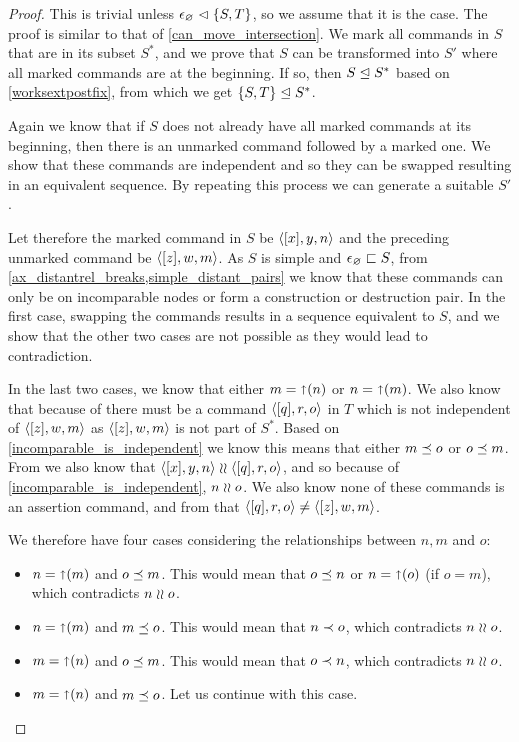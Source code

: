 \begin{proof}
This is trivial unless ${\epsilon_\varnothing}\vartriangleleft{\{{S,T}\}}$, so we assume that it is the case.
The proof is similar to that of \cref{can_move_intersection}.
We mark all commands in $S$ that are in its subset $S^*$, and
we prove that $S$ can be transformed into $S'$
where all marked commands are at the beginning.
If so, then 
${S}\trianglelefteq{S^*}$ based on \cref{worksextpostfix},
from which we get ${\{{S,T}\}}\trianglelefteq{S^*}$.

Again we know that if $S$ does not already have all marked commands at its beginning,
then there is an unmarked command followed by a marked one.
We show that these commands are independent and so they can be swapped
resulting in an equivalent sequence.
By repeating this process we can generate a suitable $S'$.

Let therefore the marked command in $S$ be $\langle{[x],y,n}\rangle$
and the preceding unmarked command be $\langle{[z],w,m}\rangle$.
As $S$ is simple and $\epsilon_\varnothing\sqsubset{S}$, from 
\cref{ax_distantrel_breaks,simple_distant_pairs}
we know that these commands can only be on incomparable nodes or form a construction or destruction pair.
In the first case, swapping the commands results in a sequence equivalent to $S$,
and we show that the other two cases are not possible as they would lead to contradiction.

In the last two cases, we know that either $m=\mathord{\shortuparrow}(n)$ or $n=\mathord{\shortuparrow}(m)$.
We also know that because of {\condApr} there must be 
a command $\langle{[q],r,o}\rangle$ in $T$ which is not independent of $\langle{[z],w,m}\rangle$
as $\langle{[z],w,m}\rangle$ is not part of $S^*$.
Based on \cref{incomparable_is_independent} we know this means that
either $m\preceq o$ or $o\preceq m$.
From {\condApr} we also know that $\langle{[x],y,n}\rangle\mathrel{\wr\wr} \langle{[q],r,o}\rangle$,
and so because of \cref{incomparable_is_independent},
$n\mathrel{\wr\wr} o$.
We also know none of these commands is an assertion command, and 
from {\condDisj} that $\langle{[q],r,o}\rangle\neq\langle{[z],w,m}\rangle$.

We therefore have four cases considering the relationships between $n,m$ and $o$:
\begin{itemize}
\item $n=\mathord{\shortuparrow}(m)$ and $o\preceq m$.
   This would mean that $o\preceq n$ or $n=\mathord{\shortuparrow}(o)$ (if $o=m$), which contradicts $n\mathrel{\wr\wr} o$.
\item $n=\mathord{\shortuparrow}(m)$ and $m\preceq o$.
   This would mean that $n\prec o$, which contradicts $n\mathrel{\wr\wr} o$.
\item $m=\mathord{\shortuparrow}(n)$ and $o\preceq m$.
   This would mean that $o\prec n$, which contradicts $n\mathrel{\wr\wr} o$.
\item $m=\mathord{\shortuparrow}(n)$ and $m\preceq o$.
   Let us continue with this case.
\end{itemize}


\end{proof}

